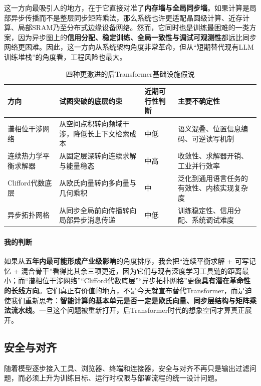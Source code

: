 \documentclass[12pt,a4paper]{article}
\begin{document}
这一方向最吸引人的地方，在于它直接对准了\textbf{内存墙与全局同步墙}。如果计算是局部异步传播而不是整层同步矩阵乘法，那么系统也许更适配晶圆级计算、近存计算、局部SRAM乃至分布式边缘设备网络。然而，它同时也是训练最困难的一类方案，因为异步图上的\textbf{信用分配、稳定训练、全局一致性与调试可观测性}都远比同步网络更困难。因此，这一方向从系统架构角度非常革命，但从“短期替代现有LLM训练堆栈”的角度看，工程风险也最大。

\begin{table}[H]
\centering
\caption{四种更激进的后Transformer基础设施假说}
\begin{tabular}{p{3.0cm}p{3.4cm}p{2.2cm}p{3.3cm}}
\toprule
\textbf{方向} & \textbf{试图突破的底层约束} & \textbf{近期可行性判断} & \textbf{主要不确定性} \\
\midrule
谱相位干涉网络 & 从空间点积转向频域干涉，降低长上下文检索成本 & 中低 & 语义混叠、位置信息编码、可逆读写机制 \\
连续热力学平衡求解器 & 从固定层深转向连续求解与能量稳态 & 中高 & 收敛性、求解器开销、工业并行效率 \\
Clifford代数底层 & 从欧氏向量转向多向量与几何乘积 & 中 & 泛化到通用语言任务的有效性、内核实现复杂度 \\
异步拓扑网格 & 从同步全局前向传播转向局部异步消息传递 & 中低 & 训练稳定性、信用分配、系统调试难度 \\
\bottomrule
\end{tabular}
\end{table}

\paragraph{我的判断}

如果从\textbf{五年内最可能形成产业级影响}的角度排序，我会把“连续平衡求解 + 可写记忆 + 混合骨干”看得比其余三项更近，因为它们与现有深度学习工具链的距离最小；而“谱相位干涉网络”“Clifford代数底层”“异步拓扑网格”更像\textbf{具有潜在革命性的长线方向}。它们真正有价值的地方，不是今天就宣布替代Transformer，而是迫使我们重新思考：\textbf{智能计算的基本单元是否一定是欧氏向量、同步层结构与矩阵乘法流水线}。一旦这个问题被重新打开，后Transformer时代的想象空间才算真正展开。

\subsection{安全与对齐}

随着模型逐步接入工具、浏览器、终端和连接器，安全与对齐不再只是输出过滤问题，而必须上升为训练目标、运行时权限与部署流程的统一设计问题。
\end{document}
